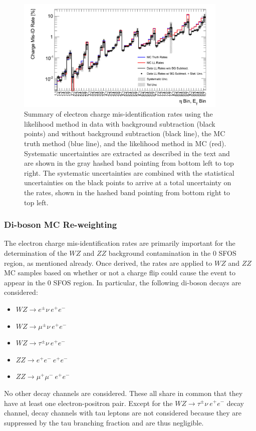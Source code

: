 \begin{figure}[htp]
\centering
\includegraphics[width=0.9\textwidth]{figures/ChargeMisID/Validation_ChargeMisIDRates_PTvsEta_FinalRateWithSys.png}
\caption{Summary of electron charge mis-identification rates using
the likelihood method in data with background subtraction (black points) 
and without background subtraction (black line), the MC truth 
method (blue line), and the likelihood method in MC (red).
Systematic uncertainties are extracted as described in the text and are shown
in the gray hashed band pointing from bottom left to top right. 
The systematic uncertainties are combined with the statistical uncertainties
on the black points to arrive at a total uncertainty on the rates, shown 
in the hashed band pointing from bottom right to top left.}
\label{fig:ChargeMisID_truthRate_finalFig}
\end{figure}




\subsubsection{Di-boson MC Re-weighting}


The electron charge mis-identification  rates are primarily important for the determination of the $WZ$ and $ZZ$ background contamination in the 0 SFOS region,
as mentioned already.
Once derived, the rates are applied to $WZ$ and $ZZ$ MC samples based on 
whether or not a charge flip could cause the event to appear in the 0 SFOS region.  
In particular, the following di-boson decays are considered:
\begin{itemize}
\item $WZ\rightarrow e^{\pm}\nu~ e^{+}e^{-}$
\item $WZ\rightarrow \mu^{\pm}\nu~ e^{+}e^{-}$
\item $WZ\rightarrow \tau^{\pm}\nu~ e^{+}e^{-}$
\item $ZZ\rightarrow e^{+}e^{-}~e^{+}e^{-}$
\item $ZZ\rightarrow \mu^{+}\mu^{-}~ e^{+}e^{-}$
\end{itemize}
No other decay channels are considered.  These all share in common that they 
have at least one electron-positron pair.  
Except for the $WZ\rightarrow \tau^{\pm}\nu~e^{+}e^{-}$ decay channel, 
decay channels with tau leptons are not considered
because they are suppressed by the tau branching fraction and are 
thus negligible.

